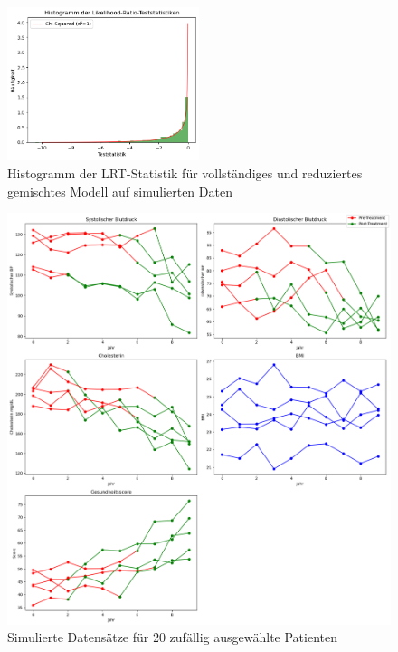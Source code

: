 \documentclass[%
thesis=student,%
coverpage=false,%
titlepage=false,%
headmarks=true, %
german,%
font=libertine, %
math=newpxtx, %
BCOR=5mm,%
coverBCOR=11mm%
]{tumbook}
\theoremstyle{break}
\begin{document}
\begin{figure}[h]
	\centering
	\includegraphics[width=0.5\textwidth]{plots/LRT_Hist_healthscore500.png}
	\caption{Histogramm der LRT-Statistik für vollständiges und reduziertes gemischtes Modell auf simulierten Daten}
	\label{fig:LRT_Hist_MM}
\end{figure} 

\begin{figure}[H]
	\centering
	\includegraphics[width=\linewidth]{plots/Herzgesundheit_Datensatz.png}
	\caption{Simulierte Datensätze für 20 zufällig ausgewählte Patienten}
	\label{fig:sample_image}
\end{figure}
\end{document}
